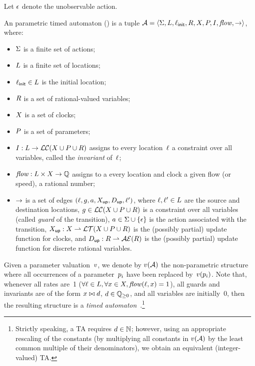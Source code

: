 Let $\epsilon$ denote the unobservable action.

\begin{definition}[\IPTA{}]\label{definition:IPTA}
	An \imitator{} parametric timed automaton (\emph{\IPTA{}}) is a tuple $\mathcal{A} = \langle\Sigma, L, \ell_{\textsf{init}}, R, X, P, I, \mathit{flow}, {\rightarrow}\rangle$, where:
	\begin{itemize}
		\item $\Sigma$ is a finite set of actions;
		\item $L$ is a finite set of locations;
		\item $\ell_{\textsf{init}} \in L$ is the initial location;
		\item $R$ is a set of rational-valued variables;
		\item $X$ is a set of clocks;
		\item $P$ is a set of parameters;
		\item $I : L \rightarrow \mathcal{LC}(X \cup P \cup R)$ assigns to every location~$\ell$ a constraint over all variables, called the \emph{invariant} of~$\ell$;
		\item $\mathit{flow} : L \times X \rightarrow \mathbb Q$ assigns to a every location and clock a given flow (or speed), \ie{} a rational number;
		\item ${\rightarrow}$ is a set of edges $(\ell, g, a, X_\mathsf{up}, D_\mathsf{up}, \ell')$, where
		      $\ell, \ell' \in L$ are the source and destination locations,
		      $g \in \mathcal{LC}(X \cup P \cup R)$ is a constraint over all variables (called \emph{guard} of the transition),
		      $a \in \Sigma \cup \{ \epsilon \}$ is the action associated with the transition,
		      $X_\mathsf{up} : X \rightharpoonup \mathcal{LT}(X \cup P \cup R)$ is the (possibly partial) update function for clocks, and
		      $D_\mathsf{up} : R \rightharpoonup \mathcal{AE}(R)$ is the (possibly partial) update function for discrete rational variables.
	\end{itemize}
\end{definition}

Given a parameter valuation~$v$, we denote by $v(\mathcal{A})$ the non-parametric structure where all occurrences of a parameter~$p_i$ have been replaced by~$v(p_i)$.
Note that, whenever
	all rates are~1 ($\forall \ell \in L, \forall x \in X, \mathit{flow}(\ell, x) = 1$),
	all guards and invariants are of the form $x \bowtie d$, $d \in \mathbb Q_{\geq 0}$,
	and
	all variables are initially~0, %
then
the resulting structure is a \emph{timed automaton}~\cite{AD94}.\footnote{%
	Strictly speaking, a TA requires $d \in \mathbb N$; however, using an appropriate rescaling of the constants (by multiplying all constants in $v(\mathcal{A})$ by the least common multiple of their denominators), we obtain an equivalent (integer-valued) TA.
}


